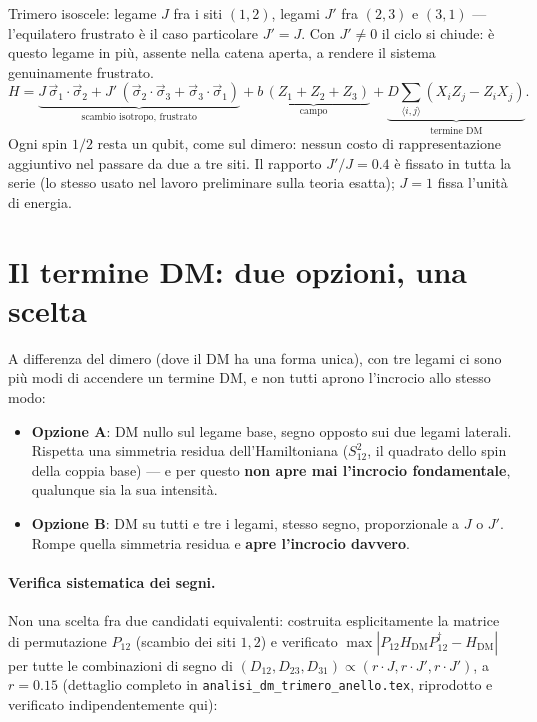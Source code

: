 \documentclass[11pt,a4paper]{article}
\begin{document}
Trimero isoscele: legame $J$ fra i siti $(1,2)$, legami $J'$ fra $(2,3)$ e
$(3,1)$ --- l'equilatero frustrato è il caso particolare $J'=J$. Con
$J'\ne0$ il ciclo si chiude: è questo legame in più, assente nella catena
aperta, a rendere il sistema genuinamente frustrato.
\begin{equation}
H = \underbrace{J\,\vec\sigma_1\!\cdot\!\vec\sigma_2 +
J'\,(\vec\sigma_2\!\cdot\!\vec\sigma_3+\vec\sigma_3\!\cdot\!\vec\sigma_1)}_{\text{scambio isotropo, frustrato}}
+ \underbrace{b\,(Z_1{+}Z_2{+}Z_3)}_{\text{campo}}
+ \underbrace{D\sum_{\langle i,j\rangle} (X_iZ_j-Z_iX_j)}_{\text{termine DM}}.
\label{eq:H}
\end{equation}
Ogni spin $1/2$ resta un qubit, come sul dimero: nessun costo di
rappresentazione aggiuntivo nel passare da due a tre siti. Il rapporto
$J'/J=0.4$ è fissato in tutta la serie (lo stesso usato nel lavoro
preliminare sulla teoria esatta); $J=1$ fissa l'unità di energia.

\section{Il termine DM: due opzioni, una scelta}

A differenza del dimero (dove il DM ha una forma unica), con tre legami ci
sono più modi di accendere un termine DM, e non tutti aprono l'incrocio
allo stesso modo:
\begin{itemize}[leftmargin=1.5em,itemsep=2pt]
\item \textbf{Opzione A}: DM nullo sul legame base, segno opposto sui due
legami laterali. Rispetta una simmetria residua dell'Hamiltoniana
($S_{12}^2$, il quadrato dello spin della coppia base) --- e per questo
\textbf{non apre mai l'incrocio fondamentale}, qualunque sia la sua
intensità.
\item \textbf{Opzione B}: DM su tutti e tre i legami, stesso segno,
proporzionale a $J$ o $J'$. Rompe quella simmetria residua e \textbf{apre
l'incrocio davvero}.
\end{itemize}

\paragraph{Verifica sistematica dei segni.} Non una scelta fra due
candidati equivalenti: costruita esplicitamente la matrice di permutazione
$P_{12}$ (scambio dei siti $1,2$) e verificato
$\max|P_{12}H_\text{DM}P_{12}^\dagger-H_\text{DM}|$ per tutte le
combinazioni di segno di $(D_{12},D_{23},D_{31})\propto(r{\cdot}J,r{\cdot}J',r{\cdot}J')$,
a $r=0.15$ (dettaglio completo in \texttt{analisi\_dm\_trimero\_anello.tex},
riprodotto e verificato indipendentemente qui):
\end{document}
